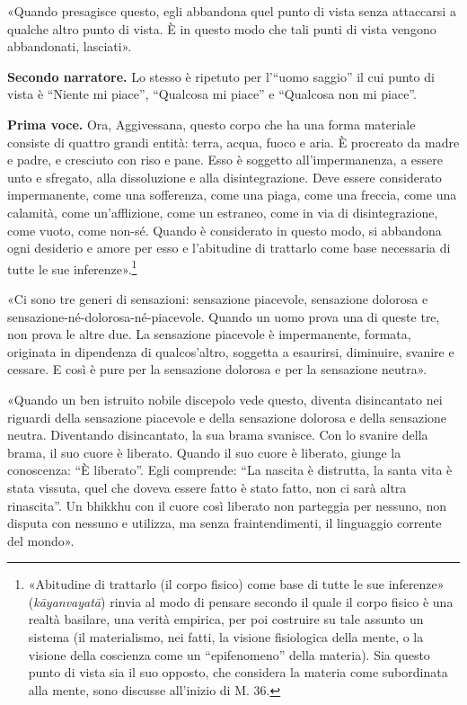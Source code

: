 «Quando presagisce questo, egli abbandona quel punto di vista senza
attaccarsi a qualche altro punto di vista. È in questo modo che tali
punti di vista vengono abbandonati, lasciati».


\textbf{Secondo narratore.} Lo stesso è ripetuto per l’“uomo saggio” il cui
punto di vista è “Niente mi piace”, “Qualcosa mi piace” e “Qualcosa non
mi piace”.


\textbf{Prima voce.} Ora, Aggivessana, questo corpo che ha una forma materiale
consiste di quattro grandi entità: terra, acqua, fuoco e aria. È
procreato da madre e padre, e cresciuto con riso e pane. Esso è soggetto
all’impermanenza, a essere unto e sfregato, alla dissoluzione e alla
disintegrazione. Deve essere considerato impermanente, come una
sofferenza, come una piaga, come una freccia, come una calamità, come
un’afflizione, come un estraneo, come in via di disintegrazione, come
vuoto, come non-sé. Quando è considerato in questo modo, si abbandona
ogni desiderio e amore per esso e l’abitudine di trattarlo come base
necessaria di tutte le sue inferenze».\footnote{«Abitudine di trattarlo (il corpo fisico) come base di tutte le sue inferenze» (\emph{kāyanvayatā}) rinvia al modo di pensare secondo il quale il corpo fisico è una realtà basilare, una verità empirica, per poi costruire su tale assunto un sistema (il materialismo, nei fatti, la visione fisiologica della mente, o la visione della coscienza come un “epifenomeno” della materia). Sia questo punto di vista sia il suo opposto, che considera la materia come subordinata alla mente, sono discusse all’inizio di M. 36.}


«Ci sono tre generi di sensazioni: sensazione piacevole, sensazione
dolorosa e sensazione-né-dolorosa-né-piacevole. Quando un uomo prova una
di queste tre, non prova le altre due. La sensazione piacevole è
impermanente, formata, originata in dipendenza di qualcos’altro,
soggetta a esaurirsi, diminuire, svanire e cessare. E così è pure per
la sensazione dolorosa e per la sensazione neutra».


«Quando un ben istruito nobile discepolo vede questo, diventa
disincantato nei riguardi della sensazione piacevole e della sensazione
dolorosa e della sensazione neutra. Diventando disincantato, la sua
brama svanisce. Con lo svanire della brama, il suo cuore è liberato.
Quando il suo cuore è liberato, giunge la conoscenza: “È liberato”. Egli
comprende: “La nascita è distrutta, la santa vita è stata vissuta, quel
che doveva essere fatto è stato fatto, non ci sarà altra rinascita”. Un
bhikkhu con il cuore così liberato non parteggia per nessuno, non
disputa con nessuno e utilizza, ma senza fraintendimenti, il linguaggio
corrente del mondo».


